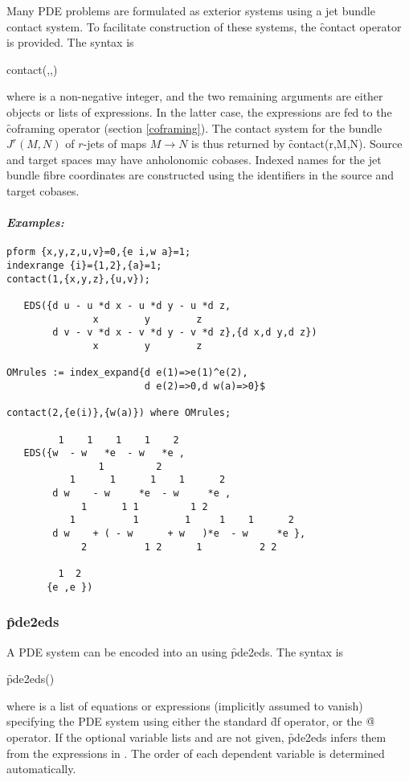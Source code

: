 \hypertarget{operator:CONTACT}{}
Many PDE problems are formulated as exterior systems using a jet bundle
contact system. To facilitate construction of these systems, the
\f{contact} operator is provided. The syntax is
\begin{syntax}
	contact(,,)
\end{syntax}
where  is a non-negative integer, and the two remaining
arguments are either  objects or lists of 
expressions. In the latter case, the expressions are fed to the
\f{coframing} operator (section \ref{coframing}). The contact system for the
bundle $J^r(M,N)$ of $r$-jets of maps $M\to N$ is thus returned by
\f{contact(r,M,N)}. Source and target spaces may have anholonomic
cobases. Indexed names for the jet bundle fibre coordinates are constructed
using the identifiers in the source and target cobases.

\paragraph{\textit{Examples:}}
\begin{verbatim}
pform {x,y,z,u,v}=0,{e i,w a}=1;
indexrange {i}={1,2},{a}=1;
contact(1,{x,y,z},{u,v});

   EDS({d u - u *d x - u *d y - u *d z,
               x        y        z
        d v - v *d x - v *d y - v *d z},{d x,d y,d z})
               x        y        z

OMrules := index_expand{d e(1)=>e(1)^e(2),
                        d e(2)=>0,d w(a)=>0}$

contact(2,{e(i)},{w(a)}) where OMrules;

         1    1    1    1    2
   EDS({w  - w   *e  - w   *e ,
                1         2
           1      1      1    1      2
        d w    - w     *e  - w     *e ,
             1      1 1         1 2
           1          1        1     1    1      2
        d w    + ( - w      + w   )*e  - w     *e },
             2          1 2      1          2 2

         1  2
       {e ,e })
\end{verbatim}

\subsubsection{\f{pde2eds}}
\label{pde2eds}

\hypertarget{operator:PDE2EDS}{}
A PDE system can be encoded into an  using \f{pde2eds}. The
syntax is
\begin{syntax}
	\f{pde2eds}()
\end{syntax}
where  is a list of equations or expressions (implicitly assumed
to vanish) specifying the PDE system using either
the standard \REDUCE \f{df} operator, or the  \f{@} operator. If the
optional variable lists  and  are not
given, \f{pde2eds} infers them from the expressions in . The
order of each dependent variable is determined automatically.

